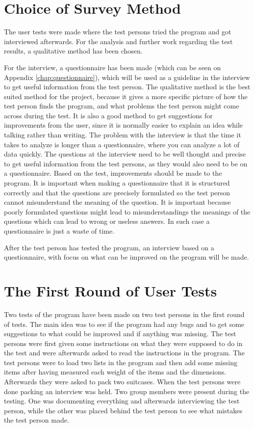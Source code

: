 \section{Choice of Survey Method}
The user tests were made where the test persons tried the program and got interviewed afterwards. For the analysis and further work regarding the test results, a qualitative method has been chosen.

For the interview, a questionnaire has been made (which can be seen on Appendix \ref{chap:questionnaire}), which will be used as a guideline in the interview to get useful information from the test person. The qualitative method is the best suited method for the project, because it gives a more specific picture of how the test person finds the program, and what problems the test person might come across during the test. It is also a good method to get suggestions for improvements from the user, since it is normally easier to explain an idea while talking rather than writing. The problem with the interview is that the time it takes to analyze is longer than a questionnaire, where you can analyze a lot of data quickly. The questions at the interview need to be well thought and precise to get useful information from the test persons, as they would also need to be on a questionnaire. Based on the test, improvements should be made to the program.
It is important when making a questionnaire that it is structured correctly and that the questions are precisely formulated so the test person cannot misunderstand the meaning of the question. It is important because poorly formulated questions might lead to misunderstandings the meanings of the questions which can lead to wrong or useless answers. In such case a questionnaire is  just a waste of time.

After the test person has tested the program, an interview based on a questionnaire, with focus on what can be improved on the program will be made.

\section{The First Round of User Tests}
Two tests of the program have been made on two test persons in the first round of tests. The main idea was to see if the program had any bugs and to get some suggestions to what could be improved and if anything was missing. The test persons were first given some instructions on what they were supposed to do in the test and were afterwards asked to read the instructions in the program. The test persons were to load two lists in the program and then add some missing items after having measured each weight of the items and the dimensions. Afterwards they were asked to pack two suitcases. When the test persons were done packing an interview was held. Two group members were present during the testing. One was documenting everything and afterwards interviewing the test person, while the other was placed behind the test person to see what mistakes the test person made.

